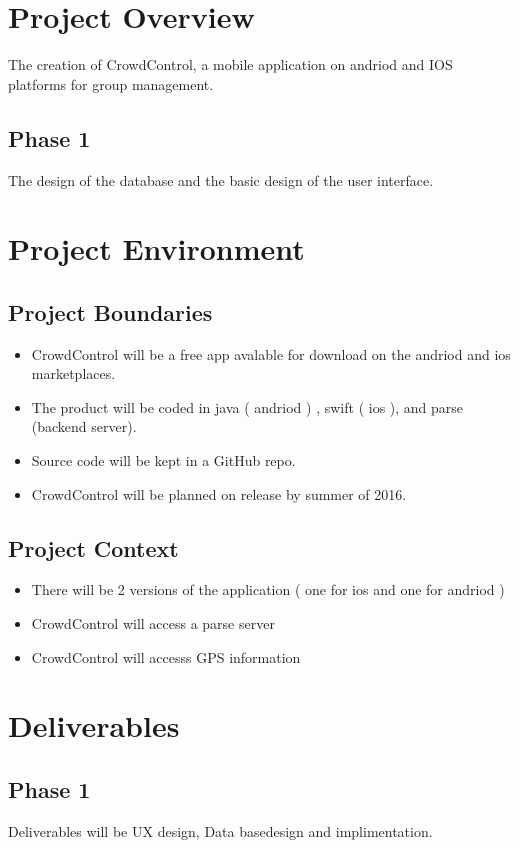 \section*{Project Overview}
The creation of CrowdControl, a mobile application on andriod and IOS platforms for group management.

\subsection*{Phase 1}
The design of the database and the basic design of the user interface.

\section*{Project Environment}

\subsection*{Project Boundaries}
	\begin{itemize}
	\item CrowdControl will be a free app avalable for download on the andriod and ios marketplaces.
	\item The product will be coded in java ( andriod ) , swift ( ios ), and parse (backend server).
	\item Source code will be kept in a GitHub repo.
	\item CrowdControl will be planned on release by summer of 2016.
	\end{itemize}
	
\subsection*{Project Context}
	\begin{itemize}
	\item There will be 2 versions of the application ( one for ios and one for andriod )
	\item CrowdControl will access a parse server
	\item CrowdControl will accesss GPS information
	\end{itemize}

\section*{Deliverables}

\subsection*{Phase 1}
Deliverables will be UX design, Data basedesign and implimentation.

